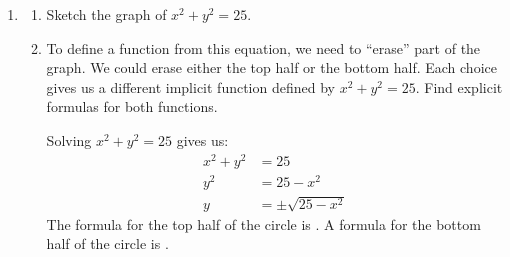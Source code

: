 \documentclass[main]{subfiles}
\begin{document}
\begin{enumerate}
\begin{minipage}[t]{4in}
\begin{enumerate}[start=2]
\begin{problem}
Let $y=f(x)$ be the implicit function defined by $x=y^5+y$. Find the value of $f(2)$.
\end{problem}

\begin{solution}
    Since $f(2)$ is the value of $y$ when $x=2$ and we know that the point $(2, 1)$ is on the graph, $f(2)=\fbox{1}$.
\end{solution}
\end{enumerate}
\end{minipage}

\item 
\begin{enumerate}
\item 
\begin{problem}
Sketch the graph of $x^2+y^2=25$.
\end{problem}

\begin{solution}
    \begin{center}
    \end{center}
\end{solution}


\item
\begin{problem}
To define a function from this equation, we need to ``erase'' part of the graph. We could erase either the top half or the bottom half. Each choice gives us a different implicit function defined by $x^2+y^2=25$. Find explicit formulas for  both functions.
\end{problem}

\begin{solution}
    Solving $x^2+y^2=25$ gives us:
    \begin{align*}
        x^2 + y^2 &= 25 \\
        y^2 &= 25 - x^2 \\
        y &= \pm \sqrt{25-x^2}
    \end{align*}
    The formula for the top half of the circle is . A formula for the bottom half of the circle is .
\end{solution}

\end{enumerate}

\end{enumerate}
\end{document}
